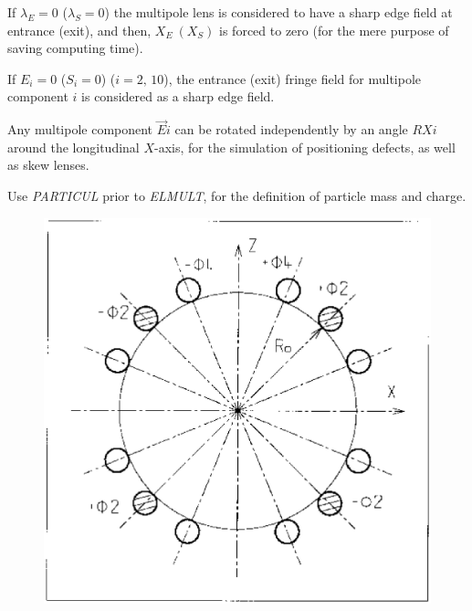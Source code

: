 {\noindent If $ \lambda_ E=0 $  ($\lambda_ S=0$)  the multipole lens is
considered to have a sharp edge field at entrance (exit), and then, 
$ X_E \ (X_S) $ is forced to zero (for the mere purpose of saving computing time).  
\medskip

\noindent If $ E_i=0 $  ($S_i=0$) ($i=2,\, 10$), the entrance (exit) fringe field for
multipole component $ i $ is considered as a sharp edge field.  

\medskip

\noindent Any multipole component $ \vec  Ei $ can be rotated
independently by an angle $ RXi $ around the longitudinal $ X$-axis, for the simulation of 
positioning defects, as well as skew lenses. 

\noindent Use \textsl{PARTICUL} prior to \textsl{ELMULT}, for the
 definition of particle mass and charge.

\vfill

\begin{figure}[H]
\centerline{\includegraphics[width=14cm]{Fig21.ps}}
{\setlength{\captionwidth}{13cm}
}\end{figure}
\vfill










}
